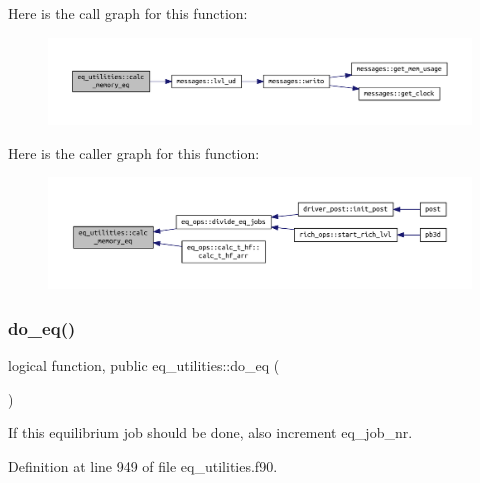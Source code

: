 Here is the call graph for this function\+:\nopagebreak
\begin{figure}[H]
\begin{center}
\leavevmode
\includegraphics[width=350pt]{namespaceeq__utilities_a5a9f230ed9a6e627e31e882e9f4a00a1_cgraph}
\end{center}
\end{figure}
Here is the caller graph for this function\+:
\nopagebreak
\begin{figure}[H]
\begin{center}
\leavevmode
\includegraphics[width=350pt]{namespaceeq__utilities_a5a9f230ed9a6e627e31e882e9f4a00a1_icgraph}
\end{center}
\end{figure}
\mbox{\label{namespaceeq__utilities_a5109472305101af3a15e8e8717c426fd}} 
\subsubsection{\texorpdfstring{do\+\_\+eq()}{do\_eq()}}
{\footnotesize\ttfamily logical function, public eq\+\_\+utilities\+::do\+\_\+eq (\begin{DoxyParamCaption}{ }\end{DoxyParamCaption})}



If this equilibrium job should be done, also increment {\ttfamily eq\+\_\+job\+\_\+nr}. 



Definition at line 949 of file eq\+\_\+utilities.\+f90.


